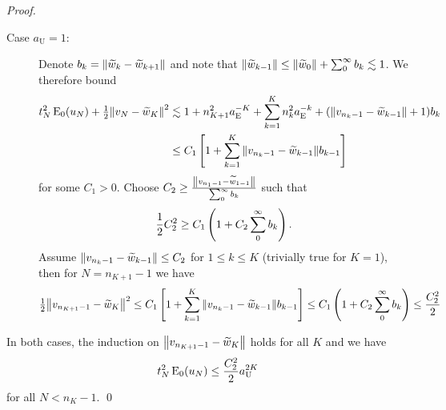 \documentclass[smallextended]{svjour3}
\newcommand{\norm}[1]{{\left\lVert #1 \right\rVert}}
\newcommand{\op}[1]{\operatorname{#1}}
\newcommand{\1}{\F{1}}
\newcommand{\aU}{a_{\op{U}}}\newcommand{\aE}{a_{\op{E}}}
\newcommand*{\var}[1]{%
	\IfEqCase{#1}{%
		{0}{u}%
		{1}{v}%
		{2}{w}%
	}[u#1]%
}
\newcommand*{\vars}[1]{%
	\IfEqCase{#1}{%
		{0}{\alpha}%
		{1}{\beta}%
		{2}{\gamma}%
		{3}{a}%
		{4}{b}%
		{5}{c}%
	}[k#1]%
}
\begin{document}
\begin{proof}
\begin{description}
			\item[Case $\aU=1$:] Denote $\vars4_k = \norm{\tilde{\var2}_k-\tilde{\var2}_{k+1}}$ and note that $\norm{\tilde{\var2}_{k-1}} \leq \norm{\tilde{\var2}_{0}} + \sum_0^\infty \vars4_k\lesssim 1$. We therefore bound
			\begin{align}
				t_N^2\op{E}_0(\var0_N) + \tfrac12\norm{\var1_N-\tilde{\var2}_K}^2 &\lesssim 1 + n_{K+1}^2\aE^{-K} + \sum_{k=1}^{K}n_k^2\aE^{-k} + (\norm{\var1_{n_k-1}-\tilde{\var2}_{k-1}} + 1)b_k
				\\&\leq C_1\left[1 + \sum_{k=1}^{K}\norm{\var1_{n_k-1}-\tilde{\var2}_{k-1}}\vars4_{k-1}\right]
			\end{align}
			for some $C_1>0$. Choose $C_2\geq \frac{\norm{\var1_{n_1-1}-\tilde{\var2}_{1-1}}}{\sum_0^\infty \vars4_k}$ such that 
			\begin{equation}
				\frac12C_2^2 \geq C_1\left(1+C_2\sum_0^\infty\vars4_k\right).
			\end{equation}
			Assume $\norm{\var1_{n_k-1}-\tilde{\var2}_{k-1}}\leq C_2$ for $1\leq k\leq K$ (trivially true for $K=1$), then for $N=n_{K+1}-1$ we have 
			\begin{equation}
				\tfrac12\norm{\var1_{n_{K+1}-1}-\tilde{\var2}_K}^2 \leq C_1\left[1 + \sum_{k=1}^{K}\norm{\var1_{n_k-1}-\tilde{\var2}_{k-1}}\vars4_{k-1}\right]
				\leq C_1\left(1+C_2\sum_0^\infty\vars4_k\right) \leq \frac{C_2^2}{2}
			\end{equation}
		\end{description}
		In both cases, the induction on $\norm{\var1_{n_{K+1}-1}-\tilde{\var2}_K}$ holds for all $K$ and we have 
		\begin{equation}
			t_N^2\op{E}_0(\var0_N) \leq \frac{C_2^2}{2}\aU^{2K}
		\end{equation}
		for all $N<n_K-1$.
		\qed\end{proof}
	
\end{document}
